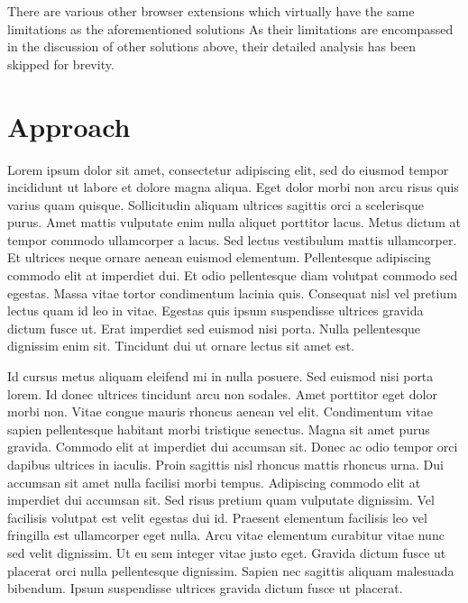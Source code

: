 \documentclass[conference]{IEEEtran}
\begin{document}
\par There are various other browser extensions which virtually have the same limitations as the aforementioned solutions\cite{BlueArca}\cite{Retruster}\cite{PhishingBoat}
As their limitations are encompassed in the discussion of other solutions above, their detailed analysis has been skipped for brevity.
\section{Approach}
Lorem ipsum dolor sit amet, consectetur adipiscing elit, sed do eiusmod tempor incididunt ut labore et dolore magna aliqua. Eget dolor morbi non arcu risus quis varius quam quisque. Sollicitudin aliquam ultrices sagittis orci a scelerisque purus. Amet mattis vulputate enim nulla aliquet porttitor lacus. Metus dictum at tempor commodo ullamcorper a lacus. Sed lectus vestibulum mattis ullamcorper. Et ultrices neque ornare aenean euismod elementum. Pellentesque adipiscing commodo elit at imperdiet dui. Et odio pellentesque diam volutpat commodo sed egestas. Massa vitae tortor condimentum lacinia quis. Consequat nisl vel pretium lectus quam id leo in vitae. Egestas quis ipsum suspendisse ultrices gravida dictum fusce ut. Erat imperdiet sed euismod nisi porta. Nulla pellentesque dignissim enim sit. Tincidunt dui ut ornare lectus sit amet est.

Id cursus metus aliquam eleifend mi in nulla posuere. Sed euismod nisi porta lorem. Id donec ultrices tincidunt arcu non sodales. Amet porttitor eget dolor morbi non. Vitae congue mauris rhoncus aenean vel elit. Condimentum vitae sapien pellentesque habitant morbi tristique senectus. Magna sit amet purus gravida. Commodo elit at imperdiet dui accumsan sit. Donec ac odio tempor orci dapibus ultrices in iaculis. Proin sagittis nisl rhoncus mattis rhoncus urna. Dui accumsan sit amet nulla facilisi morbi tempus. Adipiscing commodo elit at imperdiet dui accumsan sit. Sed risus pretium quam vulputate dignissim. Vel facilisis volutpat est velit egestas dui id. Praesent elementum facilisis leo vel fringilla est ullamcorper eget nulla. Arcu vitae elementum curabitur vitae nunc sed velit dignissim. Ut eu sem integer vitae justo eget. Gravida dictum fusce ut placerat orci nulla pellentesque dignissim. Sapien nec sagittis aliquam malesuada bibendum. Ipsum suspendisse ultrices gravida dictum fusce ut placerat.
\end{document}
